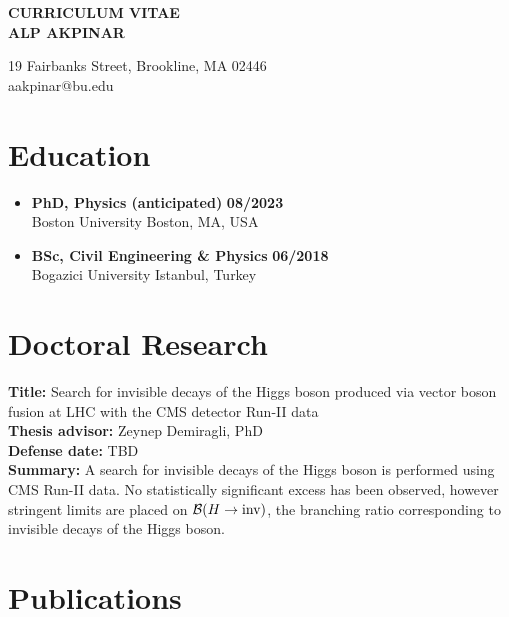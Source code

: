 

\begin{center}
{\LARGE {\bf CURRICULUM VITAE}}\\
\vspace{0.5in}
{\large {\bf ALP AKPINAR}}
\end{center}

\begin{center}
    19 Fairbanks Street, Brookline, MA 02446 \\
    aakpinar@bu.edu
\end{center}

\section*{Education}
\begin{itemize}
    \item \textbf{PhD, Physics (anticipated)} \hfill \textbf{08/2023} \\
    Boston University \hfill Boston, MA, USA 
    \item \textbf{BSc, Civil Engineering \& Physics} \hfill \textbf{06/2018} \\
    Bogazici University \hfill Istanbul, Turkey
\end{itemize}


\section*{Doctoral Research}

\textbf{Title:} Search for invisible decays of the Higgs boson produced via
vector boson fusion at LHC with the CMS detector Run-II data \\
\textbf{Thesis advisor:} Zeynep Demiragli, PhD \\
\textbf{Defense date:}   TBD \\
\textbf{Summary:} A search for invisible decays of the Higgs boson is performed using
CMS Run-II data. No statistically significant excess has been observed, however stringent
limits are placed on ${\mathcal{B}(H\rightarrow\text{inv})}$, the branching ratio corresponding to invisible decays of the
Higgs boson.

\section*{Publications}

